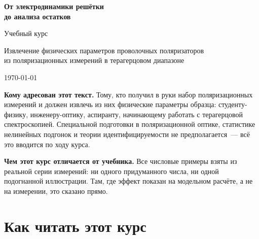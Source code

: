 %

\thispagestyle{empty}

\begin{center}
  \vspace*{1.5cm}
  {\Huge\bfseries\color{cAccent} От электродинамики решётки\\[0.35em] до анализа остатков\par}
  \vspace{0.9cm}
  {\Large Учебный курс\par}
  \vspace{1.4cm}
  {\large\color{cInk2} Извлечение физических параметров проволочных поляризаторов\\
   из поляризационных измерений в терагерцовом диапазоне\par}
  \vspace{2.4cm}
  {\color{cInk2} \today\par}
\end{center}

\vfill

\begin{tcolorbox}[enhanced,colback=cPanel,colframe=cGrid,boxrule=0.8pt,arc=2pt]
\textbf{Кому адресован этот текст.} Тому, кто получил в руки набор поляризационных измерений и
должен извлечь из них физические параметры образца: студенту-физику, инженеру-оптику,
аспиранту, начинающему работать с терагерцовой спектроскопией. Специальной подготовки в
поляризационной оптике, статистике нелинейных подгонок и теории идентифицируемости не
предполагается~--- всё это вводится по ходу курса.

\smallskip
\textbf{Чем этот курс отличается от учебника.} Все числовые примеры взяты из реальной серии
измерений: ни одного придуманного числа, ни одной подогнанной иллюстрации. Там, где эффект
показан на модельном расчёте, а не на измерении, это сказано прямо.
\end{tcolorbox}

\clearpage

\section*{Как читать этот курс}

